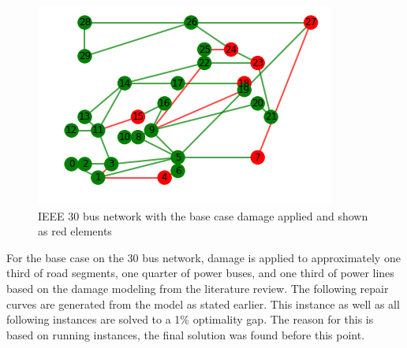 \begin{figure}[htbp]
	\centering
	
	\includegraphics[width=.9\linewidth]{BaseCaseDamagePlot.png}
	\caption{IEEE 30 bus network with the base case damage applied and shown as red elements}
	\label{fig:sub1}
\end{figure}

For the base case on the 30 bus network, damage is applied to approximately one third of road segments, one quarter of power buses, and one third of power lines based on the damage modeling from the literature review. The following repair curves are generated from the model as stated earlier. This instance as well as all following instances are solved to a 1\% optimality gap. The reason for this is based on running instances, the final solution was found before this point.  

